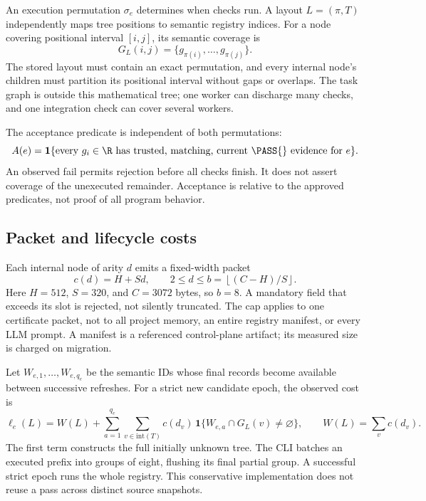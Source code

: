 An execution permutation $\sigma_e$ determines when checks run. A layout
$L=(\pi,T)$ independently maps tree positions to semantic registry indices. For
a node covering positional interval $[i,j]$, its semantic coverage is
\begin{equation}G_L(i,j)=\{g_{\pi(i)},\ldots,g_{\pi(j)}\}.\label{eq:coverage}\end{equation}
The stored layout must contain an exact permutation, and every internal node's
children must partition its positional interval without gaps or overlaps. The
task graph is outside this mathematical tree; one worker can discharge many
checks, and one integration check can cover several workers.

The acceptance predicate is independent of both permutations:
\begin{equation}A(e)=\mathbf 1\{\text{every }g_i\in\R\text{ has trusted, matching, current \PASS{} evidence for }e\}.\label{eq:accept}\end{equation}
An observed fail permits rejection before all checks finish. It does not assert
coverage of the unexecuted remainder. Acceptance is relative to the approved
predicates, not proof of all program behavior.

\subsection{Packet and lifecycle costs}\label{sec:packet}
Each internal node of arity $d$ emits a fixed-width packet
\begin{equation}c(d)=H+Sd,\qquad 2\le d\le b=\left\lfloor (C-H)/S\right\rfloor.\label{eq:price}\end{equation}
Here $H=512$, $S=320$, and $C=3072$ bytes, so $b=8$. A mandatory field that
exceeds its slot is rejected, not silently truncated. The cap applies to one
certificate packet, not to all project memory, an entire registry manifest, or
every LLM prompt. A manifest is a referenced control-plane artifact; its measured
size is charged on migration.

Let $W_{e,1},\ldots,W_{e,q_e}$ be the semantic IDs whose final records become
available between successive refreshes. For a strict new candidate epoch, the
observed cost is
\begin{equation}\ell_e(L)=W(L)+\sum_{a=1}^{q_e}\sum_{v\in\mathrm{int}(T)}c(d_v)\,\mathbf 1\{W_{e,a}\cap G_L(v)\ne\varnothing\},
\qquad W(L)=\sum_{v}c(d_v).\label{eq:lcost}\end{equation}
The first term constructs the full initially unknown tree. The CLI batches an
executed prefix into groups of eight, flushing its final partial group. A
successful strict epoch runs the whole registry. This conservative
implementation does not reuse a pass across distinct source snapshots.

